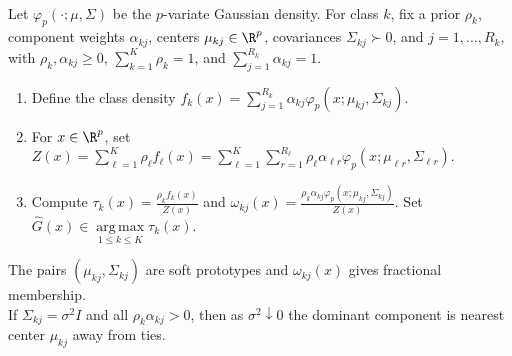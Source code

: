 \begin{method} \label{meth:sl-gaussian-mixture-prototype-classifier} \\
Let $\varphi_p(\cdot;\mu,\Sigma)$ be the $p$-variate Gaussian density.  For class $k$, fix a prior $\rho_k$, component weights $\alpha_{kj}$, centers $\mu_{kj}\in\R^p$, covariances $\Sigma_{kj}\succ0$, and $j=1,\ldots,R_k$, with $\rho_k,\alpha_{kj}\geq0$, $\sum\limits_{k=1}^K\rho_k=1$, and $\sum\limits_{j=1}^{R_k}\alpha_{kj}=1$.
\begin{enumerate}[label=(\roman*)]
\setlength{\itemsep}{0pt}
\item Define the class density $f_k(x)=\sum\limits_{j=1}^{R_k}\alpha_{kj}\varphi_p(x;\mu_{kj},\Sigma_{kj})$.
\item For $x\in\R^p$, set $Z(x)=\sum\limits_{\ell=1}^K\rho_\ell f_\ell(x)=\sum\limits_{\ell=1}^K\sum\limits_{r=1}^{R_\ell}\rho_\ell\alpha_{\ell r}\varphi_p(x;\mu_{\ell r},\Sigma_{\ell r})$.
\item Compute $\tau_k(x)=\frac{\rho_kf_k(x)}{Z(x)}$ and $\omega_{kj}(x)=\frac{\rho_k\alpha_{kj}\varphi_p(x;\mu_{kj},\Sigma_{kj})}{Z(x)}$. Set $\widehat{G}(x)\in\operatorname*{arg\,max}\limits_{1\leq k\leq K}\tau_k(x)$.
\end{enumerate}
The pairs $(\mu_{kj},\Sigma_{kj})$ are soft prototypes and $\omega_{kj}(x)$ gives fractional membership.\\
If $\Sigma_{kj}=\sigma^2I$ and all $\rho_k\alpha_{kj}>0$, then as $\sigma^2\downarrow0$ the dominant component is nearest center $\mu_{kj}$ away from ties.
\end{method}

